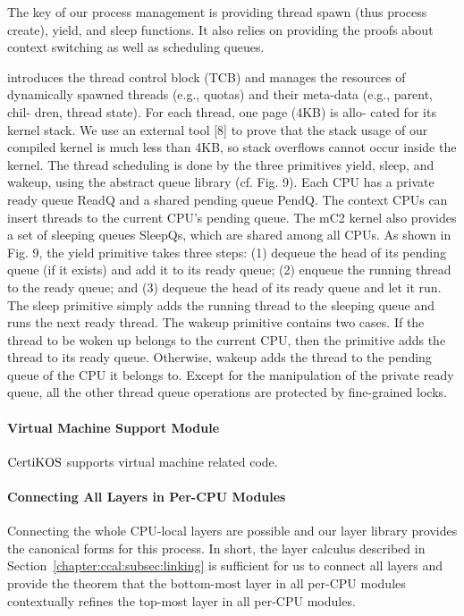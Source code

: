 The key of our process management is providing 
thread spawn (thus process create), yield, and sleep functions.
It also relies on providing the proofs about 
context switching as well as scheduling queues.


introduces the thread control block (TCB) and manages the resources of dynamically spawned threads (e.g., quotas) and their meta-data (e.g., parent, chil-
dren, thread state). For each thread, one page (4KB) is allo- cated for its kernel stack. We use an external tool [8] to prove that the stack usage of our compiled kernel is much less than 4KB, so stack overflows cannot occur inside the kernel.
The thread scheduling is done by the three primitives yield, sleep, and wakeup, using the abstract queue library (cf. Fig. 9). Each CPU has a private ready queue ReadQ and a shared pending queue PendQ. The context CPUs can insert threads to the current CPU’s pending queue. The mC2 kernel also provides a set of sleeping queues SleepQs, which are shared among all CPUs.
As shown in Fig. 9, the yield primitive takes three steps: (1) dequeue the head of its pending queue (if it exists) and add it to its ready queue; (2) enqueue the running thread to the ready queue; and (3) dequeue the head of its ready queue and let it run. The sleep primitive simply adds the running thread to the sleeping queue and runs the next ready thread. The wakeup primitive contains two cases. If the thread to be woken up belongs to the current CPU, then the primitive adds the thread to its ready queue. Otherwise, wakeup adds the thread to the pending queue of the CPU it belongs to. Except for the manipulation of the private ready queue, all the other thread queue operations are protected by fine-grained locks.


\paragraph{Virtual Machine Support Module}

$\mathrm{CertiKOS}$ supports virtual machine related code. 

\paragraph{Connecting All Layers in Per-CPU Modules}

Connecting the whole CPU-local layers are possible and 
our layer library provides the canonical forms for this process. 
In short, the layer calculus described in Section~\ref{chapter:ccal:subsec:linking} is sufficient for us to 
connect all layers and provide the theorem that 
the bottom-most layer in all per-CPU modules contextually refines the top-most layer in all per-CPU modules.
